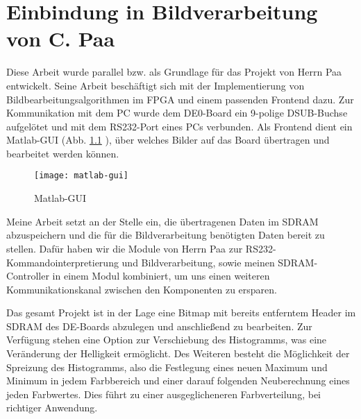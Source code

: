 \chapter{Einbindung in Bildverarbeitung von C. Paa}
\label{cha:Paa}

Diese Arbeit wurde parallel bzw. als Grundlage für das Projekt von Herrn Paa entwickelt. Seine Arbeit beschäftigt sich mit der Implementierung von Bildbearbeitungsalgorithmen im FPGA und einem passenden Frontend dazu.
Zur Kommunikation mit dem PC wurde dem DE0-Board ein 9-polige DSUB-Buchse aufgelötet und mit dem RS232-Port eines PCs verbunden. Als Frontend dient ein Matlab-GUI (Abb. \ref{fig:GUI} ), über welches Bilder auf das Board übertragen und bearbeitet werden können.

\begin{figure}[h!]
\label{fig:GUI}
\centering
\texttt{[image: matlab-gui]} %
\caption{Matlab-GUI}
\end{figure}
\FloatBarrier

Meine Arbeit setzt an der Stelle ein, die übertragenen Daten im SDRAM abzuspeichern und die für die Bildverarbeitung benötigten Daten bereit zu stellen. Dafür haben wir die Module von Herrn Paa zur RS232-Kommandointerpretierung und Bildverarbeitung, sowie meinen SDRAM-Controller in einem Modul kombiniert, um uns einen weiteren Kommunikationskanal zwischen den Komponenten zu ersparen.

Das gesamt Projekt ist in der Lage eine Bitmap mit bereits entferntem Header im SDRAM des DE-Boards abzulegen und anschließend zu bearbeiten. Zur Verfügung stehen eine Option zur Verschiebung des Histogramms, was eine Veränderung der Helligkeit ermöglicht. Des Weiteren besteht die Möglichkeit der Spreizung des Histogramms, also die Festlegung eines neuen Maximum und Minimum in jedem Farbbereich und einer darauf folgenden Neuberechnung eines jeden Farbwertes. Dies führt zu einer ausgeglicheneren Farbverteilung, bei richtiger Anwendung.